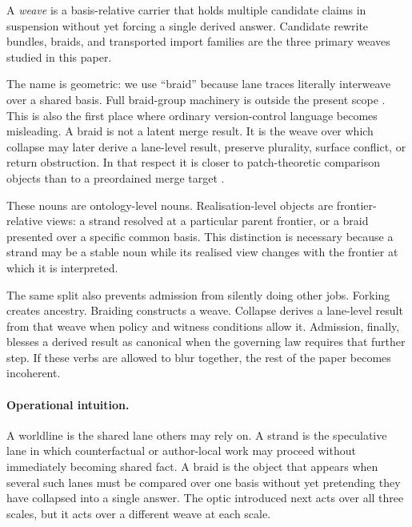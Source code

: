 \documentclass{aion}
\begin{document}
\begin{definition}[Weave]
	A \emph{weave} is a basis-relative carrier that holds multiple candidate claims in suspension without yet forcing a single derived answer. Candidate rewrite bundles, braids, and transported import families are the three primary weaves studied in this paper.
\end{definition}

The name is geometric: we use ``braid'' because lane traces literally interweave over a shared basis. Full braid-group machinery is outside the present scope \cite{Artin1947}. This is also the first place where ordinary version-control language becomes misleading. A braid is not a latent merge result. It is the weave over which collapse may later derive a lane-level result, preserve plurality, surface conflict, or return obstruction. In that respect it is closer to patch-theoretic comparison objects than to a preordained merge target \cite{MimramDiGiusto2013}.

\begin{remark}
		These nouns are ontology-level nouns. Realisation-level objects are
		frontier-relative views: a strand resolved at a particular parent frontier,
		or a braid presented over a specific common basis. This distinction is
		necessary because a strand may be a stable noun while its realised view
		changes with the frontier at which it is interpreted.
\end{remark}

The same split also prevents admission from silently doing other jobs. Forking creates ancestry. Braiding constructs a weave. Collapse derives a lane-level result from that weave when policy and witness conditions allow it. Admission, finally, blesses a derived result as canonical when the governing law requires that further step. If these verbs are allowed to blur together, the rest of the paper becomes incoherent.

\paragraph{Operational intuition.}
A worldline is the shared lane others may rely on. A strand is the speculative lane in which counterfactual or author-local work may proceed without immediately becoming shared fact. A braid is the object that appears when several such lanes must be compared over one basis without yet pretending they have collapsed into a single answer. The optic introduced next acts over all three scales, but it acts over a different weave at each scale.
\end{document}
